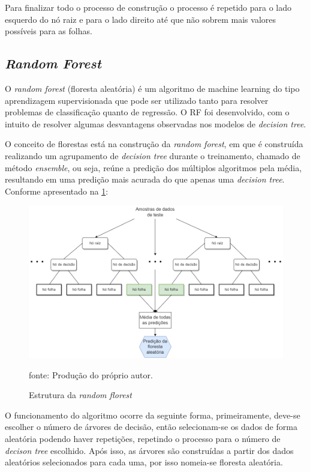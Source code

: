 \documentclass[
  12pt,		%
  a4paper,	%
  openright,%
  oneside,	%
  chapter=TITLE,		%
  section=TITLE,		%
  english,	%
  french,	%
  spanish,	%
  brazil	%
]{abntex2}
\begin{document}
    Para finalizar todo o processo de construção o processo é repetido para o lado esquerdo do nó raiz e para o lado direito até que não sobrem mais
    valores possíveis para as folhas.

    \subsection{\textit{Random Forest}}
    \label{rf}

    O \textit{random forest} (floresta aleatória) é um algoritmo de machine learning do tipo aprendizagem 
    supervisionada que pode ser utilizado tanto para resolver problemas de classificação quanto de regressão. 
    O RF foi desenvolvido, com o intuito de resolver algumas desvantagens observadas nos modelos de \textit{decision tree}.
    
    O conceito de florestas está na construção da \textit{random forest}, em que é construída realizando um agrupamento 
    de \textit{decision tree} durante o treinamento, chamado de método \textit{ensemble}, ou seja, reúne a predição 
    dos múltiplos algoritmos pela média, resultando em uma predição mais acurada do que apenas uma \textit{decision tree}. 
    Conforme apresentado na \ref*{estrutura_random_florest}:

    \begin{figure}[ht]
        \centering
        \caption{Estrutura da \textit{random florest}}
        \includegraphics[width=12cm]{../reports/figures/random_forest.png}
        \label{estrutura_random_florest}
        \par
        {\small fonte: Produção do próprio autor.}
    \end{figure}
    
    O funcionamento do algoritmo ocorre da seguinte forma, primeiramente, deve-se escolher o número de árvores de decisão, 
    então selecionam-se os dados de forma aleatória podendo haver repetições, repetindo o processo para o número de 
    \textit{decison tree} escolhido. Após isso, as árvores são construídas a partir dos dados aleatórios selecionados para cada uma,
    por isso nomeia-se floresta aleatória.
\end{document}
